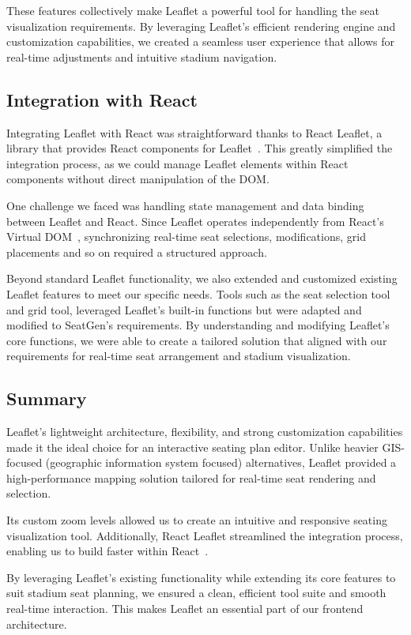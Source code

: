 These features collectively make Leaflet a powerful tool for handling the seat visualization requirements. By leveraging Leaflet’s efficient rendering engine and customization capabilities, we created a seamless user experience that allows for real-time adjustments and intuitive stadium navigation.

\subsection{Integration with React}
Integrating Leaflet with React was straightforward thanks to React Leaflet, a library that provides React components for Leaflet~\cite{ReactLeafletDocs}. This greatly simplified the integration process, as we could manage Leaflet elements within React components without direct manipulation of the DOM.

One challenge we faced was handling state management and data binding between Leaflet and React. Since Leaflet operates independently from React’s Virtual DOM~\cite{ReactLeafletDocs}, synchronizing real-time seat selections, modifications, grid placements and so on required a structured approach.

Beyond standard Leaflet functionality, we also extended and customized existing Leaflet features to meet our specific needs. Tools such as the seat selection tool and grid tool, leveraged Leaflet’s built-in functions but were adapted and modified to SeatGen’s requirements. By understanding and modifying Leaflet’s core functions, we were able to create a tailored solution that aligned with our requirements for real-time seat arrangement and stadium visualization.

\subsection{Summary}

Leaflet’s lightweight architecture, flexibility, and strong customization capabilities made it the ideal choice for an interactive seating plan editor. Unlike heavier GIS-focused (geographic information system focused) alternatives, Leaflet provided a high-performance mapping solution tailored for real-time seat rendering and selection. 

Its custom zoom levels allowed us to create an intuitive and responsive seating visualization tool. Additionally, React Leaflet streamlined the integration process, enabling us to build faster within React~\cite{ReactLeafletDocs}.

By leveraging Leaflet’s existing functionality while extending its core features to suit stadium seat planning, we ensured a clean, efficient tool suite and smooth real-time interaction. This makes Leaflet an essential part of our frontend architecture.